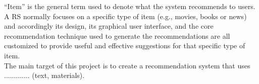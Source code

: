 \documentclass[\myFontSize,oneside,english,hidelinks,a4paper]{article}
\begin{document}
“Item” is the general term used to denote what the system recommends to users. A RS normally focuses on a specific type of item (e.g., movies, books or news) and accordingly its design, its graphical user interface, and the core recommendation technique used to generate the recommendations are all customized to provide useful and effective suggestions for that specific type of item. \cite{pub.1036183961}\\



The main target of this project is to create a recommendation system that uses ............. (text, materials).\\\\\\






\clearpage{}
\end{document}
